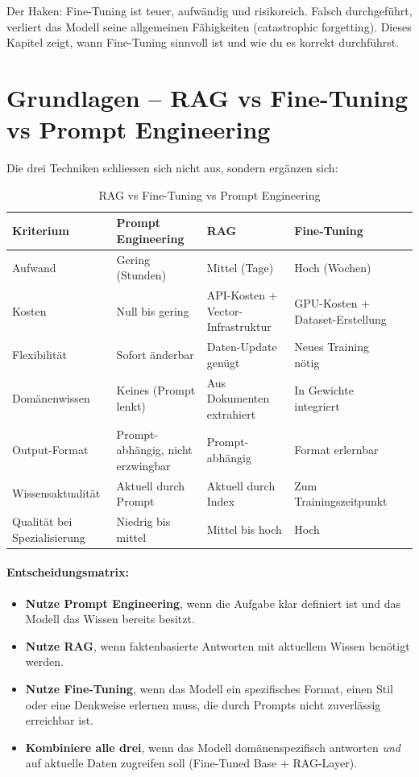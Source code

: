 Der Haken: Fine-Tuning ist teuer, aufwändig und risikoreich. Falsch durchgeführt, verliert das Modell seine allgemeinen Fähigkeiten (catastrophic forgetting). Dieses Kapitel zeigt, wann Fine-Tuning sinnvoll ist und wie du es korrekt durchführst.

\section{Grundlagen -- RAG vs Fine-Tuning vs Prompt Engineering}

Die drei Techniken schliessen sich nicht aus, sondern ergänzen sich:

\begin{table}[H]
\centering
\begin{tabularx}{\linewidth}{lXXXX}
\toprule
\textbf{Kriterium} & \textbf{Prompt Engineering} & \textbf{RAG} & \textbf{Fine-Tuning} \\
\midrule
Aufwand & Gering (Stunden) & Mittel (Tage) & Hoch (Wochen) \\
Kosten & Null bis gering & API-Kosten + Vector-Infrastruktur & GPU-Kosten + Dataset-Erstellung \\
Flexibilität & Sofort änderbar & Daten-Update genügt & Neues Training nötig \\
Domänenwissen & Keines (Prompt lenkt) & Aus Dokumenten extrahiert & In Gewichte integriert \\
Output-Format & Prompt-abhängig, nicht erzwingbar & Prompt-abhängig & Format erlernbar \\
Wissensaktualität & Aktuell durch Prompt & Aktuell durch Index & Zum Trainingszeitpunkt \\
Qualität bei Spezialisierung & Niedrig bis mittel & Mittel bis hoch & Hoch \\
\bottomrule
\end{tabularx}
\caption{RAG vs Fine-Tuning vs Prompt Engineering}
\label{tab:ft-vs-rag}
\end{table}

\paragraph{Entscheidungsmatrix:}

\begin{itemize}[leftmargin=*]
    \item \textbf{Nutze Prompt Engineering}, wenn die Aufgabe klar definiert ist und das Modell das Wissen bereits besitzt.
    \item \textbf{Nutze RAG}, wenn faktenbasierte Antworten mit aktuellem Wissen benötigt werden.
    \item \textbf{Nutze Fine-Tuning}, wenn das Modell ein spezifisches Format, einen Stil oder eine Denkweise erlernen muss, die durch Prompts nicht zuverlässig erreichbar ist.
    \item \textbf{Kombiniere alle drei}, wenn das Modell domänenspezifisch antworten \textit{und} auf aktuelle Daten zugreifen soll (Fine-Tuned Base + RAG-Layer).
\end{itemize}

